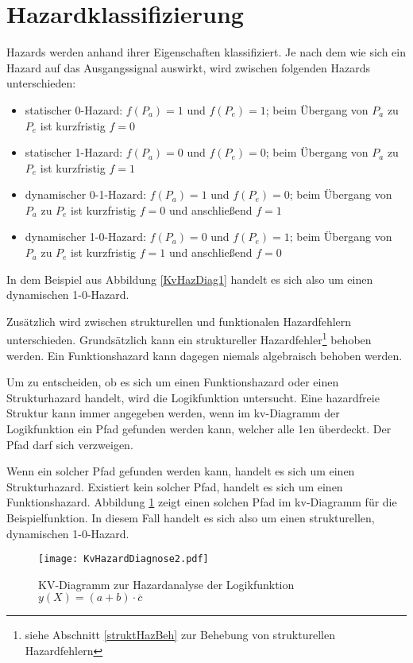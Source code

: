 \section{Hazardklassifizierung}
Hazards werden anhand ihrer Eigenschaften klassifiziert. Je nach dem wie sich ein Hazard auf das Ausgangssignal auswirkt, wird zwischen folgenden Hazards unterschieden:
\begin{itemize}
  \item statischer 0-Hazard: $f(P_a) = 1$ und $f(P_e) = 1$; beim Übergang von $P_a$ zu $P_e$ ist kurzfristig $f = 0$
  \item statischer 1-Hazard: $f(P_a) = 0$ und $f(P_e) = 0$; beim Übergang von $P_a$ zu $P_e$ ist kurzfristig $f = 1$
  \item dynamischer 0-1-Hazard: $f(P_a) = 1$ und $f(P_e) = 0$; beim Übergang von $P_a$ zu $P_e$ ist kurzfristig $f = 0$ und anschließend $f = 1$
  \item dynamischer 1-0-Hazard: $f(P_a) = 0$ und $f(P_e) = 1$; beim Übergang von $P_a$ zu $P_e$ ist kurzfristig $f = 1$ und anschließend $f = 0$
\end{itemize}
In dem Beispiel aus Abbildung \ref{KvHazDiag1} handelt es sich also um einen dynamischen 1-0-Hazard.

Zusätzlich wird zwischen strukturellen und funktionalen Hazardfehlern unterschieden. Grundsätzlich kann ein struktureller Hazardfehler\footnote{siehe Abschnitt \ref{struktHazBeh} zur Behebung von strukturellen Hazardfehlern} behoben werden. Ein Funktionshazard kann dagegen niemals algebraisch behoben werden.

Um zu entscheiden, ob es sich um einen Funktionshazard oder einen Strukturhazard handelt, wird die Logikfunktion untersucht. Eine hazardfreie Struktur kann immer angegeben werden, wenn im {\sc kv}-Diagramm der Logikfunktion ein Pfad gefunden werden kann, welcher alle 1en überdeckt. Der Pfad darf sich verzweigen. 

Wenn ein solcher Pfad gefunden werden kann, handelt es sich um einen Strukturhazard. Existiert kein solcher Pfad, handelt es sich um einen Funktionshazard. Abbildung \ref{KvHazDiag2} zeigt einen solchen Pfad im {\sc kv}-Diagramm für die Beispielfunktion. In diesem Fall handelt es sich also um einen strukturellen, dynamischen 1-0-Hazard.
\begin{figure}[htp]
	\centering
	\texttt{[image: KvHazardDiagnose2.pdf]}
	\caption{KV-Diagramm zur Hazardanalyse der Logikfunktion $y(X) = (a + b) \cdot \overline{c}$}
	\label{KvHazDiag2}
\end{figure}

